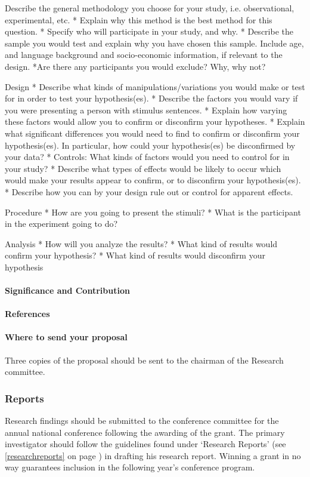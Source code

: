 {{Describe the general methodology you choose for your study, i.e. observational, experimental, etc.
* Explain why this method is the best method for this question.
* Specify who will participate in your study, and why.
* Describe the sample you would test and explain why you have chosen this sample. Include age, and language background and socio-economic information, if relevant to the design.
*Are there any participants you would exclude? Why, why not?

Design
* Describe what kinds of manipulations\slash variations you would make or test for in order to test your hypothesis(es).
* Describe the factors you would vary if you were presenting a person with stimulus sentences.
* Explain how varying these factors would allow you to confirm or disconfirm your hypotheses.
* Explain what significant differences you would need to find to confirm or disconfirm your hypothesis(es). In particular, how could your hypothesis(es) be disconfirmed by your data?
* Controls: What kinds of factors would you need to control for in your study?
* Describe what types of effects would be likely to occur which would make your results appear to confirm, or to disconfirm your hypothesis(es).
* Describe how you can by your design rule out or control for apparent effects.

Procedure
* How are you going to present the stimuli?
* What is the participant in the experiment going to do?

Analysis
* How will you analyze the results?
* What kind of results would confirm your hypothesis?
* What kind of results would disconfirm your hypothesis

\paragraph{Significance and Contribution}
\label{significanceandcontribution}

\paragraph{References}
\label{references}

\paragraph{Where to send your proposal}
\label{wheretosendyourproposal}

Three copies of the proposal should be sent to the chairman of the Research committee.

\subsubsection{Reports}
\label{reports}

Research findings should be submitted to the conference committee for the annual national conference following the awarding of the grant. The primary investigator should follow the guidelines found under `Research Reports' (see \ref{researchreports} on page \pageref{researchreports}) in drafting his research report. Winning a grant in no way guarantees inclusion in the following year's conference program.

}%
}
